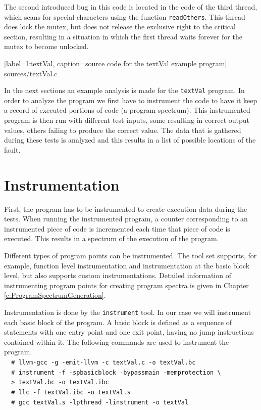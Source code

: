 The second introduced bug in this code is located in the code of the third thread,
which scans for special characters
using the function \verb|readOthers|.
This thread does lock the mutex, but does not release the exclusive right to the critical section,
resulting in a situation in which the first thread waits forever for the mutex to become unlocked.


	[label=l:textVal, caption=source code for the textVal example program]
	{sources/textVal.c}

In the next sections an example analysis is made for the \verb|textVal| program.
In order to analyze the program we first have to instrument the code to 
have it keep a record of executed portions of code (a program spectrum).
This instrumented program is then run with different test inputs,
some resulting in correct output values, others failing to produce the correct value.
The data that is gathered during these tests is analyzed and 
this results in a list of possible locations of the fault.

	
\section{Instrumentation}
\label{s:instrumentation}
	
	First, the program has to be instrumented to create execution data during the tests.
	When running the instrumented program, 
	a counter corresponding to an instrumented piece of code is incremented 
	each time that piece of code is executed.
	This results in a spectrum of the execution of the program.
	
	Different types of program points can be instrumented.
	The tool set supports, for example, function level instrumentation
	and instrumentation at the basic block level, 
	but also supports custom instrumentations.
	Detailed information of instrumenting program points for creating
	program spectra is given in Chapter \ref{c:ProgramSpectrumGeneration}.
	
	Instrumentation is done by the \verb|instrument| tool.
	In our case we will instrument each basic block of the program.
	A basic block is defined as a sequence of statements with one entry point and one exit point,
	having no jump instructions contained within it.
	The following commands are used to instrument the program.\\
	\verb|  # llvm-gcc -g -emit-llvm -c textVal.c -o textVal.bc| \\
	\verb|  # instrument -f -spbasicblock -bypassmain -memprotection \ | \\
	\verb|  > textVal.bc -o textVal.ibc| \\
	\verb|  # llc -f textVal.ibc -o textVal.s| \\
	\verb|  # gcc textVal.s -lpthread -linstrument -o textVal| \\
	
